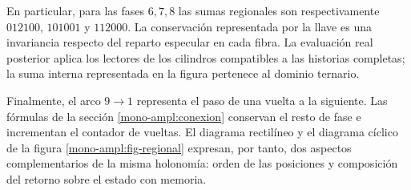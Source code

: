 En particular, para las fases \(6,7,8\) las sumas regionales son
respectivamente \(012100\), \(101001\) y \(112000\). La conservación
representada por la llave es una invariancia respecto del reparto
especular en cada fibra. La evaluación real posterior aplica los
lectores de los cilindros compatibles a las historias completas; la
suma interna representada en la figura pertenece al dominio ternario.

Finalmente, el arco \(9\to1\) representa el paso de una vuelta a la
siguiente. Las fórmulas de la sección
\ref{mono-ampl:conexion} conservan el resto de fase e incrementan el
contador de vueltas. El diagrama rectilíneo y el diagrama cíclico de la
figura \ref{mono-ampl:fig-regional} expresan, por tanto, dos aspectos
complementarios de la misma holonomía: orden de las posiciones y
composición del retorno sobre el estado con memoria.
